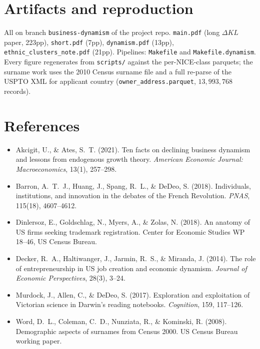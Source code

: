 \documentclass[11pt]{article}
\newcommand{\dkl}{\Delta KL}
\begin{document}
\section{Artifacts and reproduction}

All on branch \texttt{business-dynamism} of the project repo.
\texttt{main.pdf} (long $\dkl$ paper, 223pp), \texttt{short.pdf}
(7pp), \texttt{dynamism.pdf} (13pp), \texttt{ethnic\_clusters\_note.pdf}
(21pp). Pipelines: \texttt{Makefile} and \texttt{Makefile.dynamism}.
Every figure regenerates from \texttt{scripts/} against the
per-NICE-class parquets; the surname work uses the 2010 Census
surname file and a full re-parse of the USPTO XML for applicant
country (\texttt{owner\_address.parquet}, $13{,}993{,}768$ records).

\section*{References}
\begin{itemize}[leftmargin=*]\setlength\itemsep{2pt}
\item Akcigit, U., \& Ates, S.~T. (2021). Ten facts on declining
business dynamism and lessons from endogenous growth theory.
\emph{American Economic Journal: Macroeconomics}, 13(1), 257--298.
\item Barron, A.~T.~J., Huang, J., Spang, R.~L., \& DeDeo, S. (2018).
Individuals, institutions, and innovation in the debates of the
French Revolution. \emph{PNAS}, 115(18), 4607--4612.
\item Dinlersoz, E., Goldschlag, N., Myers, A., \& Zolas, N. (2018).
An anatomy of US firms seeking trademark registration. Center for
Economic Studies WP 18--46, US Census Bureau.
\item Decker, R.~A., Haltiwanger, J., Jarmin, R.~S., \& Miranda, J.
(2014). The role of entrepreneurship in US job creation and economic
dynamism. \emph{Journal of Economic Perspectives}, 28(3), 3--24.
\item Murdock, J., Allen, C., \& DeDeo, S. (2017). Exploration and
exploitation of Victorian science in Darwin's reading notebooks.
\emph{Cognition}, 159, 117--126.
\item Word, D.~L., Coleman, C.~D., Nunziata, R., \& Kominski, R.
(2008). Demographic aspects of surnames from Census 2000. US Census
Bureau working paper.
\end{itemize}
\end{document}

